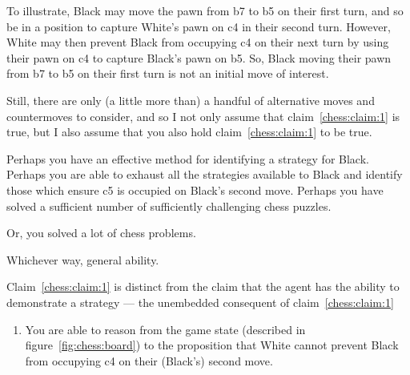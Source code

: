 \documentclass[10pt]{article}
\begin{document}

To illustrate, Black may move the pawn from b7 to b5 on their first turn, and so be in a position to capture White's pawn on c4 in their second turn.
However, White may then prevent Black from occupying c4 on their next turn by using their pawn on c4 to capture Black's pawn on b5.
So, Black moving their pawn from b7 to b5 on their first turn is not an initial move of interest.

Still, there are only (a little more than) a handful of alternative moves and countermoves to consider, and so I not only assume that claim~\ref{chess:claim:1} is true, but I also assume that you also hold claim~\ref{chess:claim:1} to be true.

\begin{note}
  Perhaps you have an effective method for identifying a strategy for Black.
  Perhaps you are able to exhaust all the strategies available to Black and identify those which ensure c5 is occupied on Black's second move.
  Perhaps you have solved a sufficient number of sufficiently challenging chess puzzles.

  Or, you solved a lot of chess problems.

  Whichever way, general ability.
\end{note}

\begin{note}
  Claim~\ref{chess:claim:1} is distinct from the claim that the agent has the ability to demonstrate a strategy --- the unembedded consequent of claim~\ref{chess:claim:1}
\begin{enumerate}
\item\label{chess:claim:2}\label{chess:claim:1:conditional} You are able to reason from the game state (described in figure~\ref{fig:chess:board}) to the proposition that White cannot prevent Black from occupying c4 on their (Black's) second move.
\end{enumerate}
\end{note}
\end{document}
